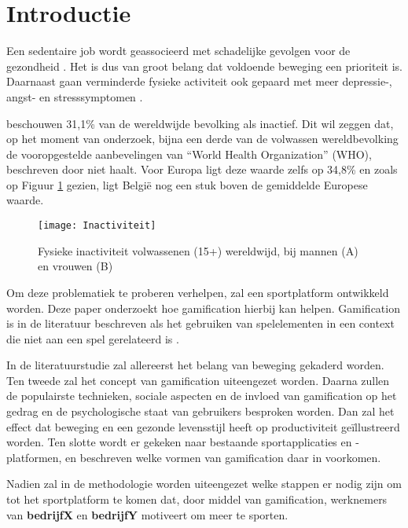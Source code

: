 
\section{Introductie}%
\label{sec:introductie}

Een sedentaire job wordt geassocieerd met schadelijke gevolgen voor de gezondheid \autocite{Buckley2015}. Het is dus van groot belang dat voldoende beweging een prioriteit is. Daarnaast gaan verminderde fysieke activiteit ook gepaard met meer depressie-, angst- en stresssymptomen \autocite{Stanton2020}.

\textcite{Hallal2012} beschouwen 31,1\% van de wereldwijde bevolking als inactief. Dit wil zeggen dat, op het moment van onderzoek, bijna een derde van de volwassen wereldbevolking de vooropgestelde aanbevelingen van ``World Health Organization'' (WHO), beschreven door \textcite{Bull2020} niet haalt. Voor Europa ligt deze waarde zelfs op 34,8\% en zoals op Figuur \ref{fig:inactivity} gezien, ligt België nog een stuk boven de gemiddelde Europese waarde.

\begin{figure}[t]
    \caption{Fysieke inactiviteit volwassenen (15+) wereldwijd, bij mannen (A) en vrouwen (B) \autocite{Bull2020}}
    \texttt{[image: Inactiviteit]}
    \label{fig:inactivity}
\end{figure}

Om deze problematiek te proberen verhelpen, zal een sportplatform ontwikkeld worden. Deze paper onderzoekt hoe gamification hierbij kan helpen. Gamification is in de literatuur beschreven als het gebruiken van spelelementen in een context die niet aan een spel gerelateerd is \autocite{Gaalen2020}.

In de literatuurstudie zal allereerst het belang van beweging gekaderd worden. Ten tweede zal het concept van gamification uiteengezet worden. Daarna zullen de populairste technieken, sociale aspecten en de invloed van gamification op het gedrag en de psychologische staat van gebruikers besproken worden. Dan zal het effect dat beweging en een gezonde levensstijl heeft op productiviteit geïllustreerd worden. Ten slotte wordt er gekeken naar bestaande sportapplicaties en -platformen, en beschreven welke vormen van gamification daar in voorkomen.

Nadien zal in de methodologie worden uiteengezet welke stappen er nodig zijn om tot het sportplatform te komen dat, door middel van gamification, werknemers van \textbf{bedrijfX} en \textbf{bedrijfY} motiveert om meer te sporten.

